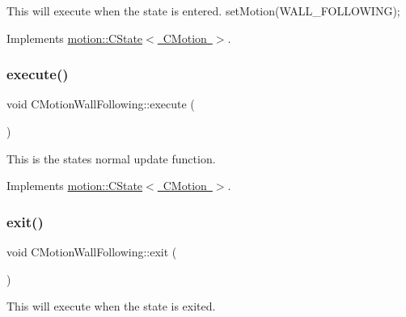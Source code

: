 This will execute when the state is entered. set\+Motion(\+W\+A\+L\+L\+\_\+\+F\+O\+L\+L\+O\+W\+I\+N\+G); 

Implements \mbox{\hyperlink{classmotion_1_1CState_a53d5fcfec223b58ccdd364a8430fd23c}{motion\+::\+C\+State$<$ C\+Motion $>$}}.

\mbox{\label{classmotion_1_1CMotionWallFollowing_a765cfe604941a06056131feb01fea66d}} 
\subsubsection{\texorpdfstring{execute()}{execute()}}
{\footnotesize\ttfamily void C\+Motion\+Wall\+Following\+::execute (\begin{DoxyParamCaption}\item[{\mbox{\hyperlink{classmotion_1_1CMotion}{C\+Motion}} $\ast$}]{ }\end{DoxyParamCaption})\hspace{0.3cm}{\ttfamily [virtual]}}

This is the states normal update function. 

Implements \mbox{\hyperlink{classmotion_1_1CState_a71dc72d345b15bf3b5b5bff596a71f33}{motion\+::\+C\+State$<$ C\+Motion $>$}}.

\mbox{\label{classmotion_1_1CMotionWallFollowing_a24be76c786b3a4bd476cc9b3c8955c26}} 
\subsubsection{\texorpdfstring{exit()}{exit()}}
{\footnotesize\ttfamily void C\+Motion\+Wall\+Following\+::exit (\begin{DoxyParamCaption}\item[{\mbox{\hyperlink{classmotion_1_1CMotion}{C\+Motion}} $\ast$}]{ }\end{DoxyParamCaption})\hspace{0.3cm}{\ttfamily [virtual]}}

This will execute when the state is exited. 

